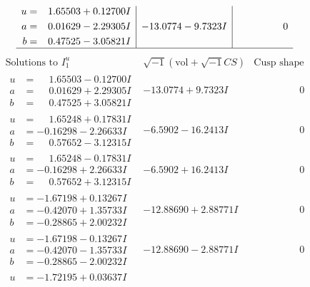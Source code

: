\documentclass[1p]{elsarticle_modified}
\theoremstyle{definition}
\newcommand{\I}{\sqrt{-1}}
\begin{document}
$$\begin{array}{c|c|c}
\begin{aligned}
u &= \phantom{-}1.65503 + 0.12700 I \\
a &= \phantom{-}0.01629 - 2.29305 I \\
b &= \phantom{-}0.47525 - 3.05821 I\end{aligned}
 & -13.0774 - 9.7323 I & \phantom{-0.000000 } 0\\
 \hline 
 \end{array}$$\newpage$$\begin{array}{c|c|c}  
\text{Solutions to }I^u_{1}& \I (\text{vol} + \sqrt{-1}CS) & \text{Cusp shape}\\
 \hline 
\begin{aligned}
u &= \phantom{-}1.65503 - 0.12700 I \\
a &= \phantom{-}0.01629 + 2.29305 I \\
b &= \phantom{-}0.47525 + 3.05821 I\end{aligned}
 & -13.0774 + 9.7323 I & \phantom{-0.000000 } 0 \\ \hline\begin{aligned}
u &= \phantom{-}1.65248 + 0.17831 I \\
a &= -0.16298 - 2.26633 I \\
b &= \phantom{-}0.57652 - 3.12315 I\end{aligned}
 & -6.5902 - 16.2413 I & \phantom{-0.000000 } 0 \\ \hline\begin{aligned}
u &= \phantom{-}1.65248 - 0.17831 I \\
a &= -0.16298 + 2.26633 I \\
b &= \phantom{-}0.57652 + 3.12315 I\end{aligned}
 & -6.5902 + 16.2413 I & \phantom{-0.000000 } 0 \\ \hline\begin{aligned}
u &= -1.67198 + 0.13267 I \\
a &= -0.42070 + 1.35733 I \\
b &= -0.28865 + 2.00232 I\end{aligned}
 & -12.88690 + 2.88771 I & \phantom{-0.000000 } 0 \\ \hline\begin{aligned}
u &= -1.67198 - 0.13267 I \\
a &= -0.42070 - 1.35733 I \\
b &= -0.28865 - 2.00232 I\end{aligned}
 & -12.88690 - 2.88771 I & \phantom{-0.000000 } 0 \\ \hline\begin{aligned}
u &= -1.72195 + 0.03637 I \\

\end{aligned}
\end{array}$$
\end{document}
